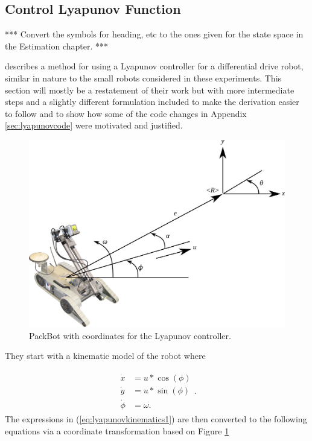 \subsection{Control Lyapunov Function}
\label{sec:controllyapunov}
*** Convert the symbols for heading, etc to the ones given for the state space in the Estimation chapter. ***

\cite{Rusu05RobotuxLyapunov} describes a method for using a Lyapunov controller for a differential drive robot, similar in nature to the small robots considered in these experiments. This section will mostly be a restatement of their work but with more intermediate steps and a slightly different formulation included to make the derivation easier to follow and to show how some of the code changes in Appendix \ref{sec:lyapunovcode} were motivated and justified.

\begin{figure}[ht!]
	\centering
	\includegraphics[width=.75\textwidth]{images/packbotlyapunov}
	\caption{PackBot with coordinates for the Lyapunov controller.}
	\label{fig:pblyapunov}
\end{figure}

They start with a kinematic model of the robot where

\begin{align}
\label{eq:lyapunovkinematics1}
\begin{split}
\dot{x} &= u*\cos(\phi) \\
\dot{y} &= u*\sin(\phi) \\
\dot{\phi} &= \omega.
\end{split}.
\end{align}
The expressions in (\ref{eq:lyapunovkinematics1}) are then converted to the following equations via a coordinate transformation based on Figure \ref{fig:pblyapunov}

